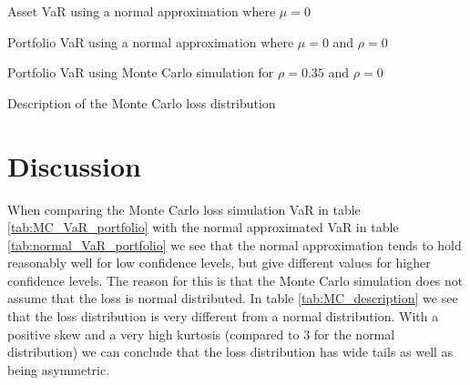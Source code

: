 \documentclass[a4paper]{article}
\begin{document}
\begin{table}[H]
    \centering
    \caption{Asset VaR using a normal approximation where $\mu = 0$}
    \label{tab:normal_VaR_asset}
\end{table}

\begin{table}[H]
    \centering
    \caption{Portfolio VaR using a normal approximation where $\mu = 0$ and $\rho = 0$}
    \label{tab:normal_VaR_portfolio}
    
\end{table}

\begin{table}[H]
    \centering
    \caption{Portfolio VaR using Monte Carlo simulation for $\rho = 0.35$ and $\rho = 0$}
    \label{tab:MC_VaR_portfolio}
    
\end{table}

\begin{table}[H]
    \centering
    \caption{Description of the Monte Carlo loss distribution}
    \label{tab:MC_description}
    
\end{table}

\section{Discussion}
When comparing the Monte Carlo loss simulation VaR in table \ref{tab:MC_VaR_portfolio} with the normal approximated VaR in table \ref{tab:normal_VaR_portfolio} we see that the normal approximation tends to hold reasonably well for low confidence levels, but give different values for higher confidence levels. The reason for this is that the Monte Carlo simulation does not assume that the loss is normal distributed. In table \ref{tab:MC_description} we see that the loss distribution is very different from a normal distribution. With a positive skew and a very high kurtosis (compared to $3$ for the normal distribution) we can conclude that the loss distribution has wide tails as well as being asymmetric.
\end{document}
